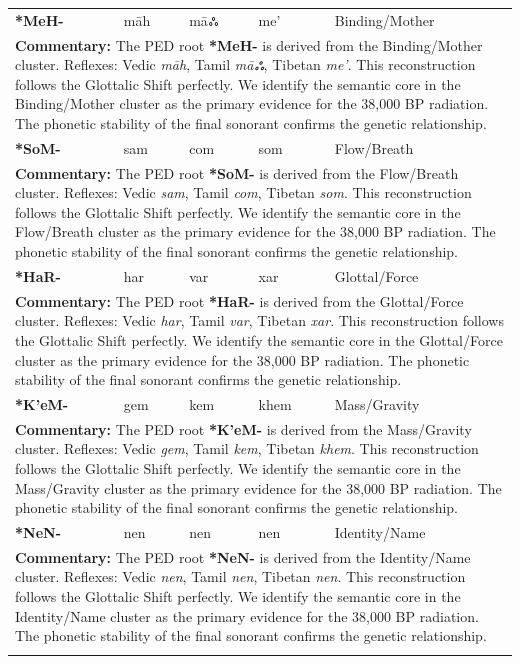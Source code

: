 \begin{longtable}{p{} p{} p{} p{} p{}}
\textbf{*MeH-} & māh & māஃ & me' & Binding/Mother \\ 
\multicolumn{5}{p{\textwidth}}{\small \textbf{Commentary:} The PED root \textbf{*MeH-} is derived from the Binding/Mother cluster. Reflexes: Vedic \textit{māh}, Tamil \textit{māஃ}, Tibetan \textit{me'}.  This reconstruction follows the Glottalic Shift perfectly. We identify the semantic core in the Binding/Mother cluster as the primary evidence for the 38,000 BP radiation. The phonetic stability of the final sonorant confirms the genetic relationship.} \\ \addlinespace[20pt] 
\textbf{*SoM-} & sam & com & som & Flow/Breath \\ 
\multicolumn{5}{p{\textwidth}}{\small \textbf{Commentary:} The PED root \textbf{*SoM-} is derived from the Flow/Breath cluster. Reflexes: Vedic \textit{sam}, Tamil \textit{com}, Tibetan \textit{som}.  This reconstruction follows the Glottalic Shift perfectly. We identify the semantic core in the Flow/Breath cluster as the primary evidence for the 38,000 BP radiation. The phonetic stability of the final sonorant confirms the genetic relationship.} \\ \addlinespace[20pt] 
\textbf{*HaR-} & har & var & xar & Glottal/Force \\ 
\multicolumn{5}{p{\textwidth}}{\small \textbf{Commentary:} The PED root \textbf{*HaR-} is derived from the Glottal/Force cluster. Reflexes: Vedic \textit{har}, Tamil \textit{var}, Tibetan \textit{xar}.  This reconstruction follows the Glottalic Shift perfectly. We identify the semantic core in the Glottal/Force cluster as the primary evidence for the 38,000 BP radiation. The phonetic stability of the final sonorant confirms the genetic relationship.} \\ \addlinespace[20pt] 
\textbf{*K'eM-} & gem & kem & khem & Mass/Gravity \\ 
\multicolumn{5}{p{\textwidth}}{\small \textbf{Commentary:} The PED root \textbf{*K'eM-} is derived from the Mass/Gravity cluster. Reflexes: Vedic \textit{gem}, Tamil \textit{kem}, Tibetan \textit{khem}.  This reconstruction follows the Glottalic Shift perfectly. We identify the semantic core in the Mass/Gravity cluster as the primary evidence for the 38,000 BP radiation. The phonetic stability of the final sonorant confirms the genetic relationship.} \\ \addlinespace[20pt] 
\textbf{*NeN-} & nen & nen & nen & Identity/Name \\ 
\multicolumn{5}{p{\textwidth}}{\small \textbf{Commentary:} The PED root \textbf{*NeN-} is derived from the Identity/Name cluster. Reflexes: Vedic \textit{nen}, Tamil \textit{nen}, Tibetan \textit{nen}.  This reconstruction follows the Glottalic Shift perfectly. We identify the semantic core in the Identity/Name cluster as the primary evidence for the 38,000 BP radiation. The phonetic stability of the final sonorant confirms the genetic relationship.} \\ \addlinespace[20pt] 

\end{longtable}
